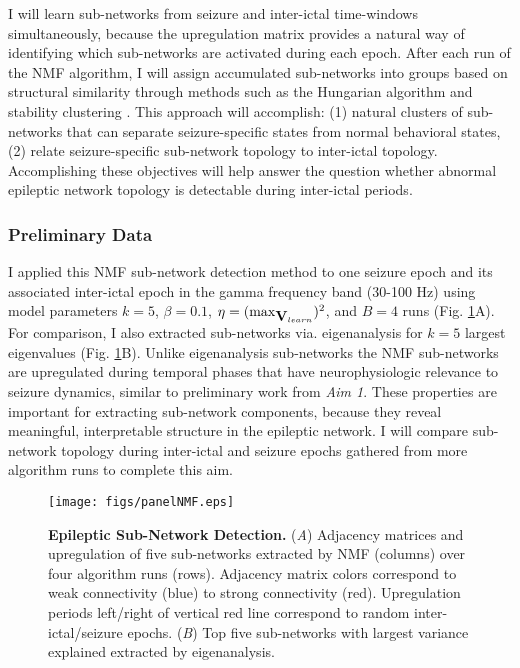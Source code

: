 I will learn sub-networks from seizure and inter-ictal time-windows simultaneously, because the upregulation matrix provides a natural way of identifying which sub-networks are activated during each epoch. After each run of the NMF algorithm, I will assign accumulated sub-networks into groups based on structural similarity through methods such as the Hungarian algorithm \cite{munkres1957algorithms, kuhn2005hungarian} and stability clustering \cite{bellec2010multilevel}. This approach will accomplish: (1) natural clusters of sub-networks that can separate seizure-specific states from normal behavioral states, (2) relate seizure-specific sub-network topology to inter-ictal topology. Accomplishing these objectives will help answer the question whether abnormal epileptic network topology is detectable during inter-ictal periods. 

\subsubsection{Preliminary Data}
I applied this NMF sub-network detection method to one seizure epoch and its associated inter-ictal epoch in the gamma frequency band (30-100 Hz) using model parameters $k=5$, $\beta=0.1$, $\eta=(\max_{\mathbf{\displaystyle V}_{learn}})^2$, and $B=4$ runs (Fig. \ref{fig:nmf}A). For comparison, I also extracted sub-networks via. eigenanalysis for $k=5$ largest eigenvalues (Fig. \ref{fig:nmf}B). Unlike eigenanalysis sub-networks the NMF sub-networks are upregulated during temporal phases that have neurophysiologic relevance to seizure dynamics, similar to preliminary work from \textit{Aim 1}. These properties are important for extracting sub-network components, because they reveal meaningful, interpretable structure in the epileptic network. I will compare sub-network topology during inter-ictal and seizure epochs gathered from more algorithm runs to complete this aim. 

\begin{figure}
\centering
\texttt{[image: figs/panelNMF.eps]}
\caption[Epileptic Sub-Networks]{\textbf{Epileptic Sub-Network Detection.} (\textit{A}) Adjacency matrices and upregulation of five sub-networks extracted by NMF (columns) over four algorithm runs (rows). Adjacency matrix colors correspond to weak connectivity (blue) to strong connectivity (red). Upregulation periods left/right of vertical red line correspond to random inter-ictal/seizure epochs. (\textit{B}) Top five sub-networks with largest variance explained extracted by eigenanalysis.}
\label{fig:nmf}
\end{figure}
